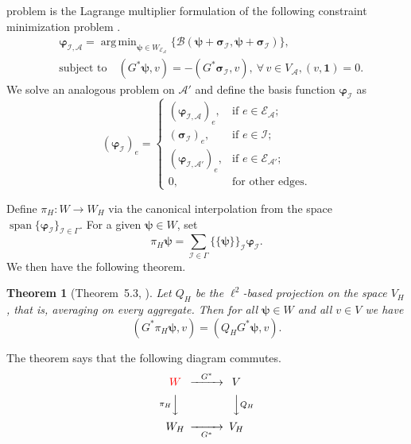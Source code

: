 \documentclass[ ]{elsarticle}
\DeclareMathOperator*{\argmin}{arg\,min}
\newcommand{\cA}{\mathcal{A}}
\newcommand{\cB}{\mathcal{B}}
\newcommand{\cE}{\mathcal{E}}
\newcommand{\cI}{\mathcal{I}}
\newcommand{\mforall}{\forall\,}
\newcommand{\Div}{G^*}
\newcommand{\vsp}{V}
\newcommand{\esp}{W}
\newcommand{\vone}{\mathbf{1}}
\newcommand{\avedg}[2]{\{\!\!\{#1\}\!\!\}_{#2}}
\newtheorem{theorem}{Theorem}[section]
\numberwithin{equation}{section}
\begin{document}
problem is the Lagrange multiplier formulation of the following
constraint minimization problem \cite{franco-inf-sup}.
\begin{align*}
  & \bm\varphi_{\cI,\cA} = \argmin_{\bm\psi\in\esp_{\cE_\cA}}\{\cB(\bm\psi+\bm\sigma_\cI,\bm\psi+\bm\sigma_\cI)\}, \\
  & \text{subject to}\quad(\Div\bm\psi,v)=-(\Div\bm\sigma_\cI,v), \ \mforall v\in \vsp_\cA,(v,\vone)=0.
\end{align*}
We solve an analogous problem on $\cA'$ and define the basis function
$\bm\varphi_\cI$ as
\begin{equation*}
  (\bm\varphi_\cI)_e=
  \begin{cases}
    (\bm\varphi_{\cI,\cA})_e,    & \text{if }e\in\cE_\cA;   \\
    (\bm\sigma_\cI)_e,          & \text{if }e\in\cI;      \\
    (\bm\varphi_{\cI,\cA'})_e,   & \text{if }e\in\cE_{\cA'}; \\
    0,                         & \text{for other edges}.
  \end{cases}
\end{equation*}

Define $\pi_H\colon \esp \to \esp_H$ via the canonical interpolation
from the space
$\operatorname{span}\{\bm\varphi_{\cI}\}_{\cI\in \Gamma}$. For a given
$\bm\psi\in\esp$, set
\begin{equation}\label{eq-definition-of-pi-H}
  \pi_H\bm\psi=\sum_{\cI\in\Gamma}\avedg{\bm\psi}{\cI}\bm\varphi_\cI.
\end{equation}
We then have the following theorem.

\begin{theorem}[Theorem~5.3, \cite{2013VassilevskiP_ZikatanovL-aa}]
  \label{thm:commuting-piH}
  Let $Q_H$ be the $\ell^2$-based projection on the space $\vsp_H$,
  that is, averaging on every aggregate. Then for all $\bm\psi\in\esp$
  and all $v\in\vsp$ we have
  \begin{equation*}
    (\Div\pi_H\bm\psi,v)=(Q_H\Div\bm\psi,v).
  \end{equation*}
\end{theorem}

The theorem says that the following diagram commutes.
\begin{equation*}
  \begin{CD}
    \color{red}{\esp} @> {\Div} >> {\vsp}     \\
    @ V{\pi_H} VV @ VV {Q_H} V   \\
    {\esp_H} @>> {\Div} > {\vsp_H} \\
  \end{CD}.
\end{equation*}
\end{document}

